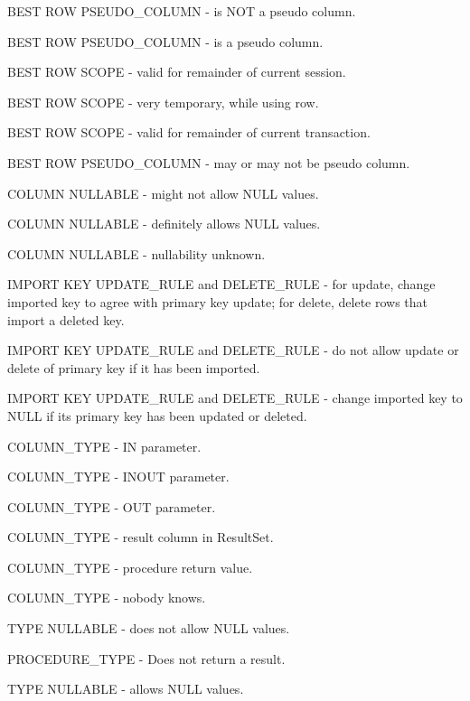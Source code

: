 \begin{description}
BEST ROW PSEUDO\_COLUMN - is NOT a pseudo column. 

BEST ROW PSEUDO\_COLUMN - is a pseudo column. 

BEST ROW SCOPE - valid for remainder of current session. 

BEST ROW SCOPE - very temporary, while using row. 

BEST ROW SCOPE - valid for remainder of current transaction. 

BEST ROW PSEUDO\_COLUMN - may or may not be pseudo column. 

COLUMN NULLABLE - might not allow NULL values. 

COLUMN NULLABLE - definitely allows NULL values. 

COLUMN NULLABLE - nullability unknown. 

IMPORT KEY UPDATE\_RULE and DELETE\_RULE - for update, change imported key to agree with primary key update; for delete, delete rows that import a deleted key. 

IMPORT KEY UPDATE\_RULE and DELETE\_RULE - do not allow update or delete of primary key if it has been imported. 

IMPORT KEY UPDATE\_RULE and DELETE\_RULE - change imported key to NULL if its primary key has been updated or deleted. 

COLUMN\_TYPE - IN parameter. 

COLUMN\_TYPE - INOUT parameter. 

COLUMN\_TYPE - OUT parameter. 

COLUMN\_TYPE - result column in ResultSet. 

COLUMN\_TYPE - procedure return value. 

COLUMN\_TYPE - nobody knows. 

TYPE NULLABLE - does not allow NULL values. 

PROCEDURE\_TYPE - Does not return a result. 

TYPE NULLABLE - allows NULL values. 


\end{description}
